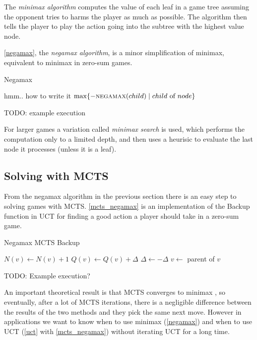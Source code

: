 The {\em minimax algorithm} computes the value of each leaf in a game
tree assuming the opponent tries to harms the player as much as
possible. The algorithm then tells the player to play the action going
into the subtree with the highest value node.

\autoref{negamax}, the {\em negamax algorithm}, is a minor simplification
of minimax, equivalent to minimax in zero-sum games.

\begin{algorithm}
\caption{Negamax}
\label{negamax}
\begin{algorithmic}
        \State \Return hmm.. how to write it
    \EndIf
    \State \Return $\max \{ - \Call{negamax}{child}
        \mid child \text{ of } node \}$
\EndFunction
\end{algorithmic}
\end{algorithm}

TODO: example execution

For larger games a variation called {\em minimax search} is used, which
performs the computation only to a limited depth, and then uses
a heurisic to evaluate the last node it processes (unless it is a leaf).

\subsection{Solving with MCTS}

From the negamax algorithm in the previous section there is an easy step
to solving games with MCTS. \autoref{mcts_negamax} is an
implementation of the Backup function in UCT for finding a good
action a player should take in a zero-sum game.

\begin{algorithm}
\caption{Negamax MCTS Backup}
\label{mcts_negamax}
\begin{algorithmic}
        \State $N(v) \gets N(v) + 1$
        \State $Q(v) \gets Q(v) + \Delta$
        \State $\Delta \gets - \Delta$
        \State $v \gets $ parent of $v$
    \EndWhile
\EndFunction
\end{algorithmic}
\end{algorithm}

TODO: Example execution?

An important theoretical result is
that MCTS converges to minimax \parencite{Kocsis},
so eventually, after a lot of MCTS iterations, there is a negligible
difference between the results of the two methods and they pick the same
next move. However in
applications we want to know when to use minimax (\autoref{negamax}) and
when to use UCT (\autoref{uct} with \autoref{mcts_negamax}) without
iterating UCT for a long time.

